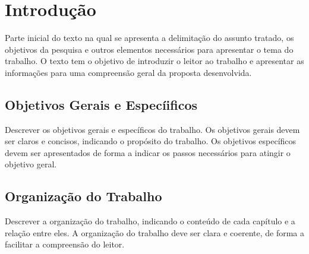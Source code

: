 
\chapter{Introdução}\label{chap:introducao} %

	Parte inicial do texto na qual se apresenta a delimitação do assunto tratado, os 
	objetivos da pesquisa e outros elementos necessários para apresentar o tema 
	do trabalho. O texto tem o objetivo de introduzir o leitor ao trabalho e 
	apresentar as informações para uma compreensão geral da proposta
	desenvolvida.

	\section{Objetivos Gerais e Especíificos}\label{sec:introducao:objetivos}

		Descrever os objetivos gerais e específicos do trabalho. Os objetivos
		gerais devem ser claros e concisos, indicando o propósito do trabalho.
		Os objetivos específicos devem ser apresentados de forma a indicar
		os passos necessários para atingir o objetivo geral.
	
	\section{Organização do Trabalho}\label{sec:introducao:organizacao}

		Descrever a organização do trabalho, indicando o conteúdo de cada capítulo
		e a relação entre eles. A organização do trabalho deve ser clara e
		coerente, de forma a facilitar a compreensão do leitor.
